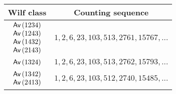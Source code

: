 \begin{tabular}{c|c}
    Wilf class & Counting sequence\\
    \hline
    $\begin{matrix}\textsf{Av}\left(1234\right)\\\textsf{Av}\left(1243\right)\\\textsf{Av}\left(1432\right)\\\textsf{Av}\left(2143\right)\end{matrix}$ & $1, 2, 6, 23, 103, 513, 2761, 15767, \dotsc$ \\
    \hline
    $\begin{matrix}\textsf{Av}\left(1324\right)\end{matrix}$ & $1, 2, 6, 23, 103, 513, 2762, 15793,\dotsc$\\
    \hline
    $\begin{matrix}\textsf{Av}\left(1342\right)\\\textsf{Av}\left(2413\right)\end{matrix}$ & $1, 2, 6, 23, 103, 512, 2740, 15485,\dotsc$
\end{tabular}